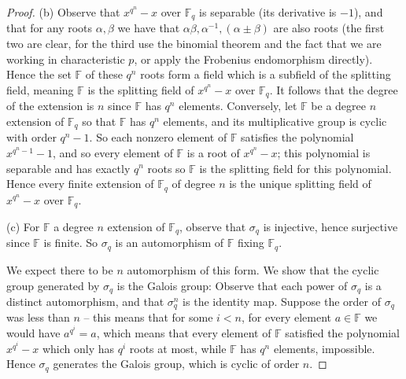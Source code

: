 \documentclass[11pt]{article}
\begin{document}
\begin{enumerate}
\begin{proof}
        (b) Observe that $x^{q^n}-x$ over $\mathbb{F}_q$ is separable (its derivative is $-1$), and that for any roots $\alpha,\beta$ we have that $\alpha\beta,\alpha^{-1}, (\alpha\pm \beta)$ are also roots (the first two are clear, for the third use the binomial theorem and the fact that we are working in characteristic $p$, or apply the Frobenius endomorphism directly). Hence the set $\mathbb{F}$ of these $q^n$ roots form a field which is a subfield of the splitting field, meaning $\mathbb{F}$ is the splitting field of $x^{q^n}-x$ over $\mathbb{F}_q$. It follows that the degree of the extension is $n$ since $\mathbb{F}$ has $q^n$ elements. Conversely, let $\mathbb{F}$ be a degree $n$ extension of $\mathbb{F}_q$ so that $\mathbb{F}$ has $q^n$ elements, and its multiplicative group is cyclic with order $q^n-1$. So each nonzero element of $\mathbb{F}$ satisfies the polynomial $x^{q^n-1}-1$, and so every element of $\mathbb{F}$ is a root of $x^{q^n}-x$; this polynomial is separable and has exactly $q^n$ roots so $\mathbb{F}$ is the splitting field for this polynomial. Hence every finite extension of $\mathbb{F}_q$ of degree $n$ is the unique splitting field of $x^{q^n}-x$ over $\mathbb{F}_q$.

        (c) For $\mathbb{F}$ a degree $n$ extension of $\mathbb{F}_q$, observe that $\sigma_q$ is injective, hence surjective since $\mathbb{F}$ is finite. So $\sigma_q$ is an automorphism of $\mathbb{F}$ fixing $\mathbb{F}_q$.

        We expect there to be $n$ automorphism of this form. We show that the cyclic group generated by $\sigma_q$ is the Galois group: Observe that each power of $\sigma_q$ is a distinct automorphism, and that $\sigma_q^n$ is the identity map. Suppose the order of $\sigma_q$ was less than $n$ -- this means that for some $i<n$, for every element $a\in \mathbb{F}$ we would have $a^{q^i} = a$, which means that every element of $\mathbb{F}$ satisfied the polynomial $x^{q^i}-x$ which only has $q^i$ roots at most, while $\mathbb{F}$ has $q^n$ elements, impossible. Hence $\sigma_q$ generates the Galois group, which is cyclic of order $n$.
        

\end{proof}
\end{enumerate}
\end{document}

